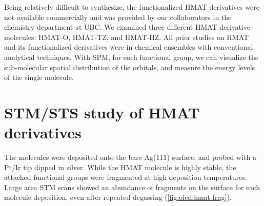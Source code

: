 \begin{figure} [h]
    \centering
    \caption{}
    \label{fig:oled:dft-hmat}
\end{figure}

Being relatively difficult to synthesize, the functionalized \ac{HMAT} derivatives were not available commercially and was provided by our collaborators in the chemistry department at \ac{UBC}. We examined three different \ac{HMAT} derivative molecules: \ac{HMAT-O}, \ac{HMAT-TZ}, and \ac{HMAT-HZ}. All prior studies on \ac{HMAT} and its functionalized derivatives were in chemical ensembles with conventional analytical techniques. With \ac{SPM}, for each functional group, we can visualize the sub-molecular spatial distribution of the orbitals, and measure the energy levels of the single molecule. 







\section{{STM}/{STS} study of HMAT derivatives}

The molecules were deposited onto the bare Ag(111) surface, and probed with a Pt/Ir tip dipped in silver. While the \ac{HMAT} molecule is highly stable, the attached functional groups were fragmented at high deposition temperatures. Large area \ac{STM} scans showed an abundance of fragments on the surface for each molecule deposition, even after repeated degassing (\autoref{fig:oled:hmat-frag}). 

